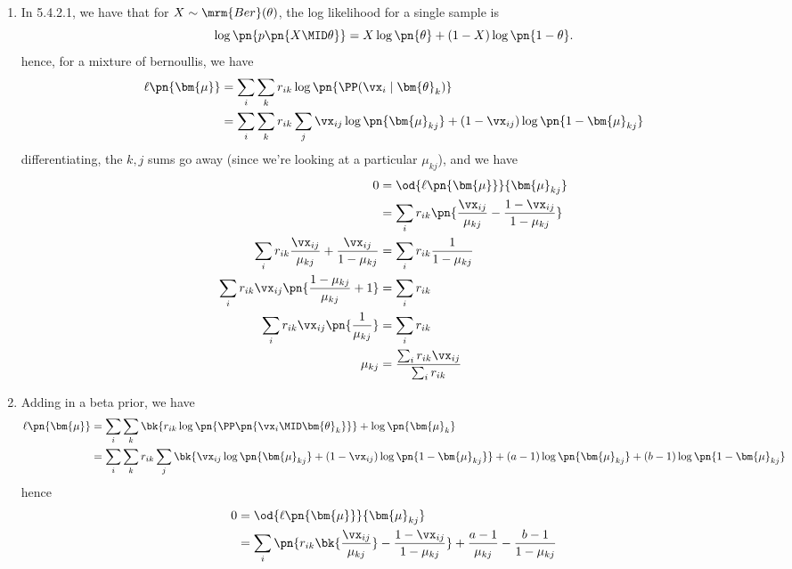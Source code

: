 \documentclass[189]{pset}
\begin{document}
  \begin{enumerate}
  \item In 5.4.2.1, we have that for $X \sim \mrm{Ber}(\theta)$, the
    log likelihood for a single sample is
    \[
      \log\pn{p\pn{X \MID \theta}} = X \log\pn{\theta} + (1-X)
      \log\pn{1 - \theta}.
    \]
    hence, for a mixture of bernoullis, we have
    \begin{align*}
      \ell\pn{\bm{\mu}}
      &= \sum_i \sum_k r_{ik} \log \pn{ \PP (\vx_i \mid
        \bm{\theta}_k)} \\
      &= \sum_i \sum_k r_{ik} \sum_j \vx_{ij} \log\pn{\bm{\mu}_{kj}} +
        (1-\vx_{ij}) \log\pn{1 - \bm{\mu}_{kj}}
    \end{align*}
    differentiating, the $k,j$ sums go away (since we're looking at a
    particular $\mu_{kj}$), and we have
    \begin{align*}
      0 &=
      \od{\ell\pn{\bm{\mu}}}{\bm{\mu}_{kj}}\\
      &= \sum_i r_{ik} \pn{\frac{\vx_{ij}}{\mu_{kj}} - \frac{1 -
        \vx_{ij}}{1 - \mu_{kj}}} \\
      \sum_i r_{ik} \frac{\vx_{ij}}{\mu_{kj}} + \frac{\vx_{ij}}{1 -
      \mu_{kj}}
      &= \sum_i r_{ik} \frac{1}{1 - \mu_{kj}} \\
      \sum_i r_{ik} \vx_{ij} \pn{\frac{1 - \mu_{kj}}{\mu_{kj}} + 1}
      &= \sum_i r_{ik} \\
      \sum_i r_{ik}\vx_{ij} \pn{\frac{1}{\mu_{kj}}}
      &= \sum_i r_{ik} \\
      \mu_{kj}
      &= \frac{\sum_i r_{ik} \vx_{ij}}{\sum_i r_{ik}}
    \end{align*}
  \item Adding in a beta prior, we have
    \begin{align*}
      \ell\pn{\bm{\mu}}
      &= \sum_i \sum_k \bk{r_{ik}\log\pn{\PP\pn{\vx_i \MID
        \bm{\theta}_k}}} + \log\pn{\bm{\mu}_k} \\
      &= \sum_i \sum_k r_{ik} \sum_j \bk{\vx_{ij}
        \log\pn{\bm{\mu}_{kj}} + (1-\vx_{ij}) \log\pn{1 -
        \bm{\mu}_{kj}}} + (a-1) \log \pn{\bm{\mu}_{kj}} + (b-1) \log
        \pn{1-\bm{\mu}_{kj}}
    \end{align*}
    hence
    \begin{align*}
      0
      &= \od{\ell\pn{\bm{\mu}}}{\bm{\mu}_{kj}} \\
      &= \sum_i \pn{r_{ik} \bk{\frac{\vx_{ij}}{\mu_{kj}}} - \frac{1 -
        \vx_{ij}}{1 - \mu_{kj}}} + \frac{a-1}{\mu_{kj}} -
        \frac{b-1}{1 -\mu_{kj}}\\

\end{align*}
\end{enumerate}
\end{document}
